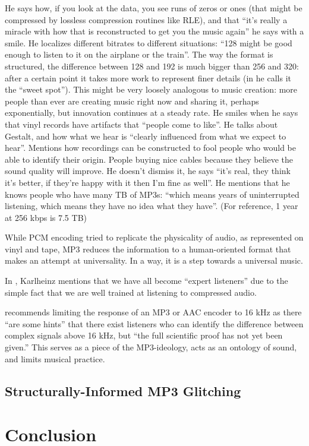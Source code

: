 \documentclass{thesis}
\begin{document}
He says how, if you look at the data, you see runs of zeros or ones (that might be compressed by lossless compression routines like RLE), and that ``it's really a miracle with how that is reconstructed to get you the music again'' he says with a smile. He localizes different bitrates to different situations: ``128 might be good enough to listen to it on the airplane or the train''. The way the format is structured, the difference between 128 and 192 is much bigger than 256 and 320: after a certain point it takes more work to represent finer details (in \cite[9]{karlheinz_brandenburg_mp3_????} he calls it the ``sweet spot''). This might be very loosely analogous to music creation: more people than ever are creating music right now and sharing it, perhaps exponentially, but innovation continues at a steady rate. He smiles when he says that vinyl records have artifacts that ``people come to like''. He talks about Gestalt, and how what we hear is ``clearly influenced from what we expect to hear''. Mentions how recordings can be constructed to fool people who would be able to identify their origin. People buying nice cables because they believe the sound quality will improve. He doesn't dismiss it, he says ``it's real, they think it's better, if they're happy with it then I'm fine as well''. He mentions that he knows people who have many TB of MP3s: ``which means years of uninterrupted listening, which means they have no idea what they have''. (For reference, 1 year at 256 kbps is 7.5 TB) \cite{tom_merritt_real_2010}

While PCM encoding tried to replicate the physicality of audio, as represented on vinyl and tape, MP3 reduces the information to a human-oriented format that makes an attempt at universality. In a way, it is a step towards a universal music.

In \cite[9]{karlheinz_brandenburg_mp3_????}, Karlheinz mentions that we have all become ``expert listeners'' due to the simple fact that we are well trained at listening to compressed audio.

\cite[10]{karlheinz_brandenburg_mp3_????} recommends limiting the response of an MP3 or AAC encoder to 16 kHz as there ``are some hints'' that there exist listeners who can identify the difference between complex signals above 16 kHz, but ``the full scientific proof has not yet been given.'' This serves as a piece of the MP3-ideology, acts as an ontology of sound, and limits musical practice.
	
\section{Structurally-Informed MP3 Glitching}

\chapter{Conclusion}



\end{document}
